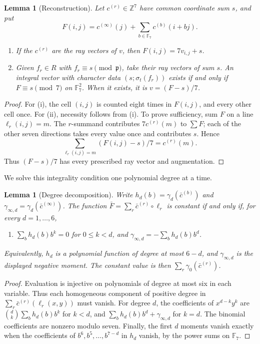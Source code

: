 \documentclass[11pt]{amsart}
\theoremstyle{plain}
\newtheorem{lemma}[theorem]{Lemma}
\theoremstyle{definition}
\numberwithin{equation}{section}
\newcommand{\Z}{\mathbb Z}
\newcommand{\F}{\mathbb F}
\newcommand{\pp}{\mathfrak p}
\begin{document}
\begin{lemma}[Reconstruction]\label{lem:interp}
Let $c^{(r)}\in\Z^7$ have common coordinate sum $s$, and put
\[
 F(i,j)=c^{(\infty)}(j)+\sum_{b\in\F_7}c^{(b)}(i+bj).
\]
\begin{enumerate}
\item[(i)] If the $c^{(r)}$ are the ray vectors of $v$, then
$F(i,j)=7v_{i,j}+s$.
\item[(ii)] Given $f_r\in R$ with $f_r\equiv s\pmod\pp$, take their
ray vectors of sum $s$. An integral vector with character data
$(s;\sigma_t(f_r))$ exists if and only if $F\equiv s\pmod7$ on
$\F_7^2$. When it exists, it is $v=(F-s)/7$.
\end{enumerate}
\end{lemma}
\begin{proof}
For (i), the cell $(i,j)$ is counted eight times in $F(i,j)$, and
every other cell once.
For (ii), necessity follows from (i).
To prove sufficiency, sum $F$ on a line $\ell_r(i,j)=m$.
The $r$-summand contributes
$7c^{(r)}(m)$ to $\sum F$; each of the other seven directions takes
every value once and contributes $s$. Hence
\[
 \sum_{\ell_r(i,j)=m}(F(i,j)-s)/7=c^{(r)}(m).
\]
Thus $(F-s)/7$ has every prescribed ray vector and augmentation.
\end{proof}

We solve this integrality condition one polynomial degree at a time.
\begin{lemma}[Degree decomposition]\label{lem:degree}
Write $h_d(b)=\gamma_d(\bar c^{(b)})$ and
$\gamma_{\infty,d}=\gamma_d(\bar c^{(\infty)})$.
The function $\bar F=\sum_r\bar c^{(r)}\circ\ell_r$ is constant
if and only if, for every $d=1,\ldots,6$,
\begin{enumerate}
\item[(K$_d$)] $\sum_bh_d(b)b^k=0$ for $0\le k<d$, and
$\gamma_{\infty,d}=-\sum_bh_d(b)b^d$.
\end{enumerate}
Equivalently, $h_d$ is a polynomial function of degree at most
$6-d$, and $\gamma_{\infty,d}$ is the displayed negative moment.
The constant value is then $\sum_r\gamma_0(\bar c^{(r)})$.
\end{lemma}
\begin{proof}
Evaluation is injective on polynomials of degree at most six in
each variable. Thus each homogeneous component of positive degree
in $\sum_r\bar c^{(r)}(\ell_r(x,y))$ must vanish.
For degree $d$, the coefficients of $x^{d-k}y^k$ are
$\binom dk\sum_bh_d(b)b^k$ for $k<d$, and
$\sum_bh_d(b)b^d+\gamma_{\infty,d}$ for $k=d$.
The binomial coefficients are nonzero modulo seven.
Finally, the first $d$ moments vanish exactly when the coefficients
of $b^6,b^5,\ldots,b^{7-d}$ in $h_d$ vanish, by the power sums on
$\F_7$.
\end{proof}
\end{document}
